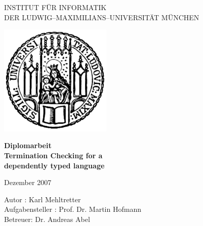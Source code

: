 \documentclass[a4paper,11pt,openright]{report}
\theoremstyle{remark}
\begin{document}
\begin{titlepage}
\begin{center}


\vspace*{-2cm}

{\Huge INSTITUT F\"UR INFORMATIK\\[1mm]} %
DER LUDWIG--MAXIMILIANS--UNIVERSIT\"AT M\"UNCHEN\\

\vspace*{1cm}

\includegraphics[width=0.4\textwidth]{siegel.pdf}

\vspace*{2cm}

{\Large \textbf{Diplomarbeit}}\\

\vspace{2.0cm}
{\Huge \textbf{Termination Checking for a}}\\
\vspace*{3mm}
{\Huge \textbf{dependently typed language}}\\

\vspace{2cm}

\large{Dezember 2007}

\vspace{1.5cm}

  \begin{Large}
      Autor : Karl Mehltretter\\
      Aufgabensteller : Prof. Dr. Martin Hofmann\\
      Betreuer: Dr. Andreas Abel
  \end{Large}

\end{center}
\end{titlepage} 


\end{document}
